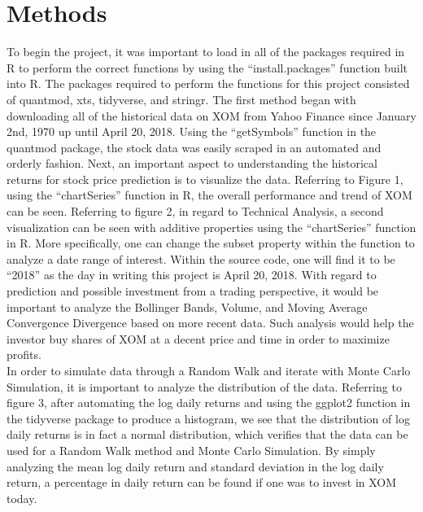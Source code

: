 \documentclass{article}
\begin{document}
\section{Methods}
To begin the project, it was important to load in all of the packages required in R to perform the correct functions by using the “install.packages” function built into R. The packages required to perform the functions for this project consisted of quantmod, xts, tidyverse, and stringr. The first method began with downloading all of the historical data on XOM from Yahoo Finance since January 2nd, 1970 up until April 20, 2018. Using the “getSymbols” function in the quantmod package, the stock data was easily scraped in an automated and orderly fashion. Next, an important aspect to understanding the historical returns for stock price prediction is to visualize the data. Referring to Figure 1, using the “chartSeries” function in R, the overall performance and trend of XOM can be seen. Referring to figure 2, in regard to Technical Analysis, a second visualization can be seen with additive properties using the “chartSeries” function in R. More specifically, one can change the subset property within the function to analyze a date range of interest. Within the source code, one will find it to be “2018” as the day in writing this project is April 20, 2018. With regard to prediction and possible investment from a trading perspective, it would be important to analyze the Bollinger Bands, Volume, and Moving Average Convergence Divergence based on more recent data. Such analysis would help the investor buy shares of XOM at a decent price and time in order to maximize profits.
\\
In order to simulate data through a Random Walk and iterate with Monte Carlo Simulation, it is important to analyze the distribution of the data. Referring to figure 3, after automating the log daily returns and using the ggplot2 function in the tidyverse package to produce a histogram, we see that the distribution of log daily returns is in fact a normal distribution, which verifies that the data can be used for a Random Walk method and Monte Carlo Simulation. By simply analyzing the mean log daily return and standard deviation in the log daily return, a percentage in daily return can be found if one was to invest in XOM today.
\\
\end{document}
